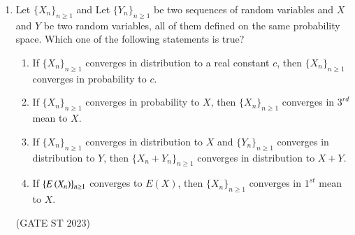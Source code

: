 \begin{enumerate}
\item Let $\{X_n\}_{n \geq 1}$ and Let $\{Y_n\}_{n \geq 1}$ be two sequences of random variables and $X$ and $Y$
be two random variables, all of them defined on the same probability space.
Which one of the following statements is true?
\begin{enumerate}[label=(\Alph*)]
\item If $\{X_n\}_{n \geq 1}$ converges in distribution to a real constant $c$, then $\{X_n\}_{n \geq 1}$
converges in probability to $c$.
\item If $\{X_n\}_{n \geq 1}$ converges in probability to $X$, then $\{X_n\}_{n \geq 1}$ converges in $3^{rd}$ mean
to $X$.
\item If $\{X_n\}_{n \geq 1}$ converges in distribution to $X$ and $\{Y_n\}_{n \geq 1}$ converges in
distribution to $Y$, then $\{X_n + Y_n\}_{n \geq 1}$ converges in distribution to $X+Y$.
\item If $\{E\left(X_n\right)\}_{n \geq 1}$ converges to $E(X)$, then $\{X_n\}_{n \geq 1}$ converges in $1^{st}$ mean to $X$.
\end{enumerate}
\hfill (GATE ST 2023)

\end{enumerate}
